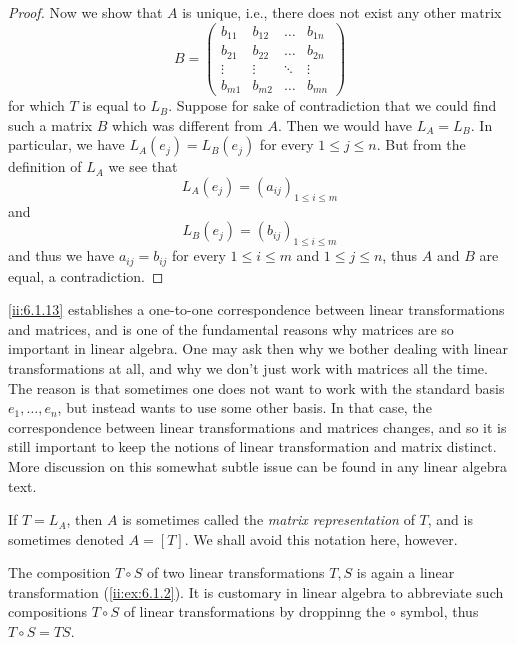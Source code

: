 \begin{proof}
  Now we show that \(A\) is unique, i.e., there does not exist any other matrix
  \[
    B = \begin{pmatrix}
      b_{11} & b_{12} & \dots  & b_{1n} \\
      b_{21} & b_{22} & \dots  & b_{2n} \\
      \vdots & \vdots & \ddots & \vdots \\
      b_{m1} & b_{m2} & \dots  & b_{mn}
    \end{pmatrix}
  \]
  for which \(T\) is equal to \(L_B\).
  Suppose for sake of contradiction that we could find such a matrix \(B\) which was different from \(A\).
  Then we would have \(L_A = L_B\).
  In particular, we have \(L_A(e_j) = L_B(e_j)\) for every \(1 \leq j \leq n\).
  But from the definition of \(L_A\) we see that
  \[
    L_A(e_j) = (a_{ij})_{1 \leq i \leq m}
  \]
  and
  \[
    L_B(e_j) = (b_{ij})_{1 \leq i \leq m}
  \]
  and thus we have \(a_{ij} = b_{ij}\) for every \(1 \leq i \leq m\) and \(1 \leq j \leq n\), thus \(A\) and \(B\) are equal, a contradiction.
\end{proof}

\begin{rmk}\label{ii:6.1.14}
  \cref{ii:6.1.13} establishes a one-to-one correspondence between linear transformations and matrices, and is one of the fundamental reasons why matrices are so important in linear algebra.
  One may ask then why we bother dealing with linear transformations at all, and why we don't just work with matrices all the time.
  The reason is that sometimes one does not want to work with the standard basis \(e_1, \dots, e_n\), but instead wants to use some other basis.
  In that case, the correspondence between linear transformations and matrices changes, and so it is still important to keep the notions of linear transformation and matrix distinct.
  More discussion on this somewhat subtle issue can be found in any linear algebra text.
\end{rmk}

\begin{rmk}\label{ii:6.1.15}
  If \(T = L_A\), then \(A\) is sometimes called the \emph{matrix representation} of \(T\), and is sometimes denoted \(A = [T]\).
  We shall avoid this notation here, however.
\end{rmk}

\begin{note}
  The composition \(T \circ S\) of two linear transformations \(T, S\) is again a linear transformation (\cref{ii:ex:6.1.2}).
  It is customary in linear algebra to abbreviate such compositions \(T \circ S\) of linear transformations by droppinng the \(\circ\) symbol, thus \(T \circ S = TS\).
\end{note}

